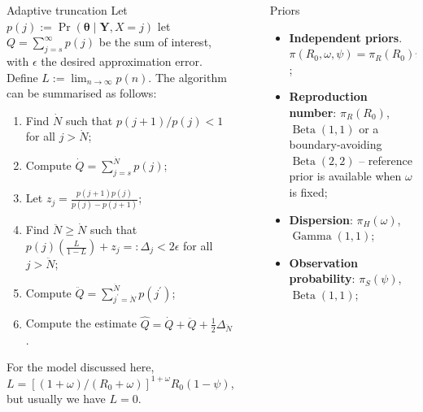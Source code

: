 \documentclass[final]{beamer}
\newcommand{\disp}{\omega}					%
\newcommand{\seqrate}{\psi}					%
\newcommand{\pr}{\operatorname{Pr}} %
\newlength{\sepwidth}
\newlength{\colwidth}
\newcommand{\separatorcolumn}{\begin{column}{\sepwidth}\end{column}}
\begin{document}
\begin{frame}[t]
\begin{columns}[t]
\begin{column}{\colwidth}
  \begin{alertblock}{Adaptive truncation}
  Let $p(j) := \pr\left(\boldsymbol{\theta} \mid \boldsymbol{Y}, X = j \right)$ let $Q = \sum_{j=s}^\infty p(j)$ be the sum of interest, with $\epsilon$ the desired approximation error.
  Define $L := \lim_{n \to \infty} p(n)$.
  The algorithm can be summarised as follows:
  \begin{enumerate}
  \item Find $\dot{N}$ such that $p(j + 1)/p(j) < 1$ for all $j > \dot{N}$;
  \item  Compute $\dot{Q} = \sum_{j=s}^{\dot{N}} p(j)$;
  \item Let $z_j = \frac{p(j+1) p(j)}{p(j) - p(j + 1)}$;
  \item  Find $\ddot{N} \geq \dot{N}$ such that $p(j) \left( \frac{L}{1-L}\right) + z_j =: \Delta_j < 2\epsilon$ for all $j > \ddot{N}$;
  \item Compute $\ddot{Q} = \sum_{{j^\prime}=\dot{N}}^{\ddot{N}} p(j^\prime)$;
  \item Compute the estimate $\hat{Q} = \dot{Q} + \ddot{Q} + \frac{1}{2}\Delta_{\ddot{N}}$.
  \end{enumerate}
  For the model discussed here, $L = \left[(1 + \disp)/(R_0 + \disp)\right]^{1 + \disp} R_0 (1-\seqrate)$, but usually we have $L=0$.
  \end{alertblock}
  \end{column}

  \separatorcolumn

  \begin{column}{\colwidth}

    \begin{block}{Priors}
     \begin{itemize}
     \item \textbf{Independent priors}.  $\pi(R_0, \disp, \seqrate) = \pi_R(R_0)\pi_H(\disp)\pi_S(\psi)$;
     \item \textbf{Reproduction number}: $\pi_R(R_0)$, $\operatorname{Beta}(1, 1)$ or a boundary-avoiding $\operatorname{Beta}(2, 2)$ -- reference prior is available when $\disp$ is fixed;
     \item \textbf{Dispersion}: $\pi_H(\disp)$, $\operatorname{Gamma}(1, 1)$;
     \item \textbf{Observation probability}: $\pi_S(\psi)$, $\operatorname{Beta}(1, 1)$;
    \end{itemize}



\end{block}
\end{column}
\end{columns}
\end{frame}
\end{document}
